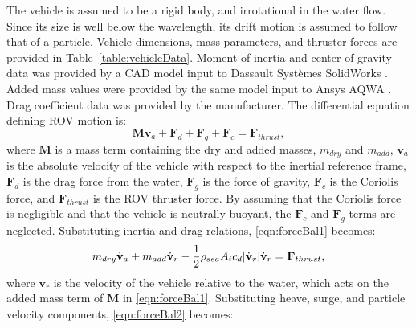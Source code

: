 \documentclass[letterpaper, 10 pt, conferences]{IEEEconf}  %
\DeclarePairedDelimiter\abs{\lvert}{\rvert}%
\renewcommand{\vec}[1]{\mathbf{#1}}
\begin{document}
The vehicle is assumed to be a rigid body, and irrotational in the water flow. Since its size is well below the wavelength, its drift motion is assumed to follow that of a particle. Vehicle dimensions, mass parameters, and thruster forces are provided in Table~\ref{table:vehicleData}. Moment of inertia and center of gravity data was provided by a CAD model input to Dassault Systèmes SolidWorks \cite{solidworks}. Added mass values were provided by the same model input to Ansys AQWA \cite{aqwa}. Drag coefficient data was provided by the manufacturer. The differential equation defining ROV motion is: 
\begin{equation}
\vec{M}\dot{\vec{v}}_a + \vec{F}_d + \vec{F}_g + \vec{F}_c = \vec{F}_{thrust},
\label{eqn:forceBal1}
\end{equation}
where $\vec{M}$ is a mass term containing the dry and added masses, $m_{dry}$ and $m_{add}$, $\vec{v}_a$ is the absolute velocity of the vehicle with respect to the inertial reference frame, $\vec{F}_d$ is the drag force from the water, $\vec{F}_g$ is the force of gravity, $\vec{F}_c$ is the Coriolis force, and $\vec{F}_{thrust}$ is the ROV thruster force. By assuming that the Coriolis force is negligible and that the vehicle is neutrally buoyant, the $\vec{F}_c$ and $\vec{F}_g$ terms are neglected. Substituting inertia and drag relations, \eqref{eqn:forceBal1} becomes: 
\begin{equation}
m_{dry} \dot{\vec{v}}_a + m_{add} \dot{\vec{v}}_r - \frac{1}{2} \rho_{sea} A_i c_d \abs{\dot{\vec{v}}_r} \dot{\vec{v}}_r = \vec{F}_{thrust},
\label{eqn:forceBal2}
\end{equation}
where $\vec{v}_r$ is the velocity of the vehicle relative to the water, which acts on the added mass term of $\vec{M}$ in \eqref{eqn:forceBal1}. Substituting heave, surge, and particle velocity components, \eqref{eqn:forceBal2} becomes:
\end{document}
